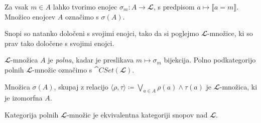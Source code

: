 \begin{lema}
  Za vsak \(m ∈ A\) lahko tvorimo enojec \(\sigma_m : A → 𝓛\), s predpisom
  \(a ↦ ⟦a = m⟧\). Množico enojcev \(A\) označimo s \(\sigma(A)\).
\end{lema}

Snopi so natanko določeni s svojimi enojci, tako da si poglejmo \(𝓛\)-množice, ki so prav tako določene s svojimi enojci.

\begin{definicija}
  \(𝓛\)-množica \(A\) je \emph{polna}, kadar je preslikava \(m ↦ \sigma_m\) bijekcija.
  Polno podkategorijo polnih \(𝓛\)-množic označimo s \(\cat{CSet}(𝓛)\).
\end{definicija}

\begin{izrek}
  Množica \(\sigma(A)\), skupaj z relacijo \(⟨\rho, \tau⟩ ≔ \bigvee_{a ∈ A} \rho(a)∧\tau(a)\)
  je \(𝓛\)-množica, ki je izomorfna \(A\).
\end{izrek}
\begin{dokaz}
\end{dokaz}

\begin{trditev}
\end{trditev}

\begin{izrek}
  Kategorija polnih \(𝓛\)-množic je ekvivalentna kategoriji snopov nad \(𝓛\).
\end{izrek}



